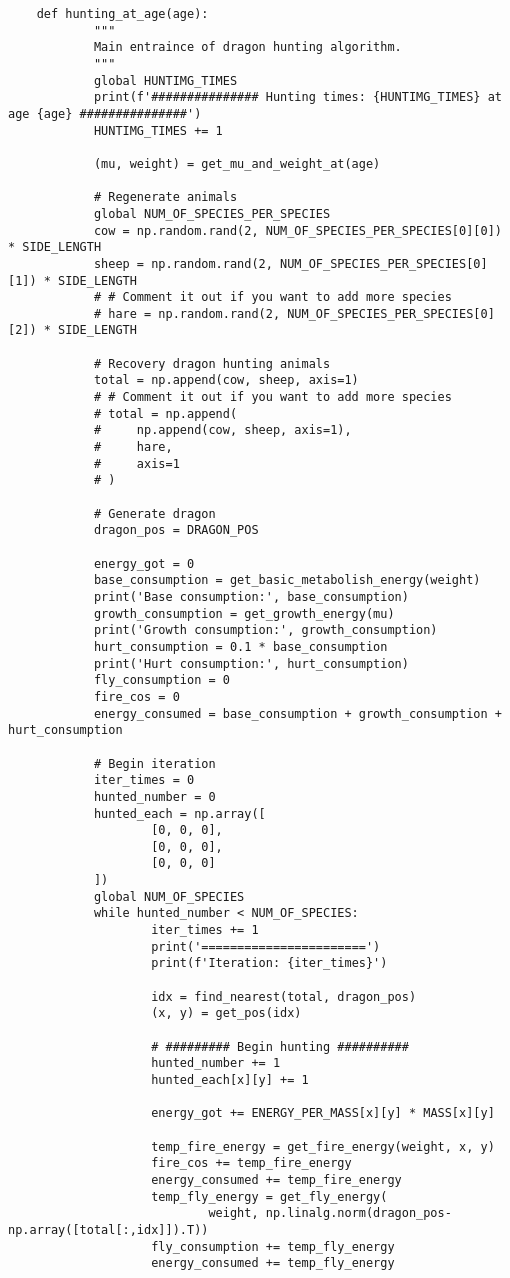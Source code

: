 \begin{lstlisting}
	def hunting_at_age(age):
			"""
			Main entraince of dragon hunting algorithm.
			"""
			global HUNTIMG_TIMES
			print(f'############### Hunting times: {HUNTIMG_TIMES} at age {age} ###############')
			HUNTIMG_TIMES += 1
	
			(mu, weight) = get_mu_and_weight_at(age)
	
			# Regenerate animals
			global NUM_OF_SPECIES_PER_SPECIES
			cow = np.random.rand(2, NUM_OF_SPECIES_PER_SPECIES[0][0]) * SIDE_LENGTH
			sheep = np.random.rand(2, NUM_OF_SPECIES_PER_SPECIES[0][1]) * SIDE_LENGTH
			# # Comment it out if you want to add more species
			# hare = np.random.rand(2, NUM_OF_SPECIES_PER_SPECIES[0][2]) * SIDE_LENGTH
	
			# Recovery dragon hunting animals
			total = np.append(cow, sheep, axis=1)
			# # Comment it out if you want to add more species
			# total = np.append(
			#     np.append(cow, sheep, axis=1),
			#     hare,
			#     axis=1
			# )
	
			# Generate dragon
			dragon_pos = DRAGON_POS
	
			energy_got = 0
			base_consumption = get_basic_metabolish_energy(weight)
			print('Base consumption:', base_consumption)
			growth_consumption = get_growth_energy(mu)
			print('Growth consumption:', growth_consumption)
			hurt_consumption = 0.1 * base_consumption
			print('Hurt consumption:', hurt_consumption)
			fly_consumption = 0
			fire_cos = 0
			energy_consumed = base_consumption + growth_consumption + hurt_consumption
	 
			# Begin iteration
			iter_times = 0
			hunted_number = 0
			hunted_each = np.array([
					[0, 0, 0],
					[0, 0, 0],
					[0, 0, 0]
			])
			global NUM_OF_SPECIES
			while hunted_number < NUM_OF_SPECIES:
					iter_times += 1
					print('=======================')
					print(f'Iteration: {iter_times}')
	
					idx = find_nearest(total, dragon_pos)
					(x, y) = get_pos(idx)
	
					# ######### Begin hunting ##########
					hunted_number += 1
					hunted_each[x][y] += 1
	
					energy_got += ENERGY_PER_MASS[x][y] * MASS[x][y]
	
					temp_fire_energy = get_fire_energy(weight, x, y)
					fire_cos += temp_fire_energy
					energy_consumed += temp_fire_energy
					temp_fly_energy = get_fly_energy(
							weight, np.linalg.norm(dragon_pos-np.array([total[:,idx]]).T))
					fly_consumption += temp_fly_energy
					energy_consumed += temp_fly_energy
	

\end{lstlisting}

